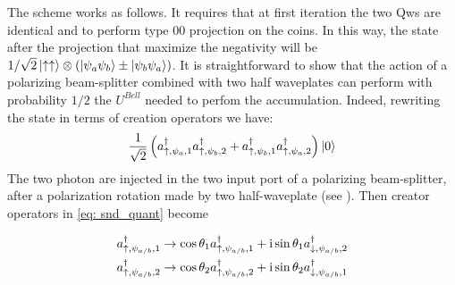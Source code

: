 \documentclass[
	aps, pra, authorblock, superscriptaddress, twocolumn,
	10pt
]{revtex4-1}
\begin{document}
The scheme works as follows. It requires that at first iteration the two Qws are identical and to perform type 00 projection on the coins. In this way, the state after the projection that maximize the negativity will be $1/\sqrt{2}\ket{\uparrow \uparrow}\otimes(\ket{\psi_a\psi_b}\pm\ket{\psi_b\psi_a})$. 
It is straightforward to show that the action of a polarizing beam-splitter combined with two half waveplates can perform with probability $1/2$ the $U^{Bell}$ needed to perfom the accumulation.
Indeed, rewriting the state in terms of creation operators we have:
\begin{equation}
    \frac{1}{\sqrt{2}}\left(a^{\dagger}_{\uparrow, \psi_a,1}a^{\dagger}_{\uparrow, \psi_b,2}+a^{\dagger}_{\uparrow, \psi_b,1}a^{\dagger}_{\uparrow, \psi_a,2} \right)\ket{0} 
    \label{eq: snd_quant}
\end{equation}
The two photon are injected in the two input port of a polarizing beam-splitter, after a polarization rotation made by two half-waveplate (see ). Then creator operators in \cref{eq: snd_quant} become

\begin{align}
    a^{\dagger}_{\uparrow, \psi_{a/b},1} & \rightarrow \cos{\theta_1}a^{\dagger}_{\uparrow, \psi_{a/b},1} + \mathrm{i}\sin{\theta_1}a^{\dagger}_{\downarrow, \psi_{a/b},2}\notag \\
     a^{\dagger}_{\uparrow, \psi_{a/b},2} & \rightarrow \cos{\theta_2}a^{\dagger}_{\uparrow, \psi_{a/b},2} + \mathrm{i}\sin{\theta_2}a^{\dagger}_{\downarrow, \psi_{a/b},1}
\end{align}
\end{document}

